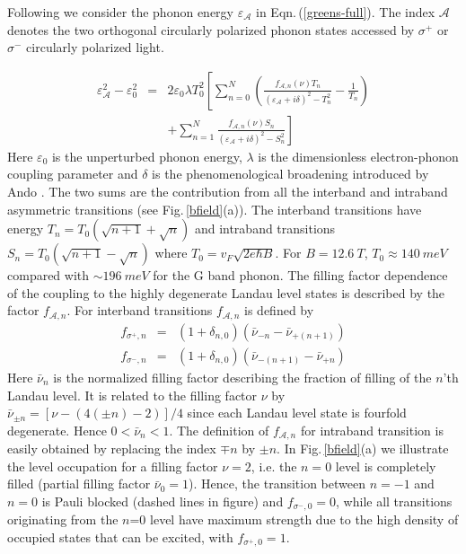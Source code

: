 \documentclass[prl,aps,superscriptaddress,showpacs,reprint]{revtex4-1}
\begin{document}
Following \cite{goerbig2007filling,ando2007magnetic,kossacki2012circular} we consider the phonon energy $\varepsilon_{\mathcal{A}}$ in Eqn.\,(\ref{greens-full}). The index $\mathcal{A}$ denotes the two orthogonal circularly polarized phonon states accessed by $\sigma^+$ or $\sigma^-$ circularly polarized light.

\begin{eqnarray}
\label{greens-full}
\varepsilon_{\mathcal{A}}^2-\varepsilon_0^2 &=& 2\varepsilon_0 \lambda T_0^2 \left[ \sum_{n=0}^N\left(\frac{f_{\mathcal{A},n}\left(\nu\right) T_n}{\left(\varepsilon_{\mathcal{A}}+i\delta\right)^2-T_n^2}-\frac{1}{T_n}\right)\right.\nonumber \\
& &\left. +\sum_{n=1}^{N}\frac{f_{\mathcal{A},n}\left(\nu\right) S_n}{\left(\varepsilon_{\mathcal{A}}+i\delta\right)^2-S_n^2}\right]
\end{eqnarray}
Here $\varepsilon_0$ is the unperturbed phonon energy, $\lambda$ is the dimensionless electron-phonon coupling parameter and $\delta$ is the phenomenological broadening introduced by Ando \cite{ando2007magnetic}. The two sums are the contribution from all the interband and intraband asymmetric transitions (see Fig.\,\ref{bfield}(a)). The interband transitions have energy $T_n=T_0\left(\sqrt{n+1}+\sqrt{n}\right)$ and intraband transitions $S_n=T_0\left(\sqrt{n+1}-\sqrt{n}\right)$ where $T_0=v_F\sqrt{2e\hbar B}$. For $B=12.6\: T$, $T_0 \approx 140\: meV$ compared with $\sim 196\: meV$ for the G band phonon.
The filling factor dependence of the coupling to the highly degenerate Landau level states is described by the factor $f_{\mathcal{A},n}$. For interband transitions $f_{\mathcal{A},n}$ is defined by
\begin{eqnarray}
\label{fterm}
f_{\sigma^+,n}&=&(1+\delta_{n,0})(\bar{\nu}_{-n}-\bar{\nu}_{+(n+1)})\nonumber\\
f_{\sigma^-,n}&=&(1+\delta_{n,0})(\bar{\nu}_{-(n+1)}-\bar{\nu}_{+n})
\end{eqnarray}
Here  $\bar{\nu}_{n} $ is the normalized  filling factor describing the fraction of filling of the $n$’th Landau level. It is related to the filling factor $\nu$ by $\bar{\nu}_{\pm n} = \left[\nu -(4(\pm n)-2)\right]/4$ since each Landau level state is fourfold degenerate.
Hence $0<\bar{\nu}_{n}<1$. The definition of $f_{\mathcal{A},n}$ for intraband transition is easily obtained by replacing the index $\mp n$ by $\pm n$. In  Fig.\,\ref{bfield}(a) we illustrate the level occupation for a filling factor $\nu=2$, i.e. the $n=0$ level is completely filled (partial filling factor $\bar{\nu}_0=1$). Hence,  the transition between $n=-1$ and $ n=0$ is Pauli blocked (dashed lines in figure) and  $f_{\sigma^-,0}=0$, while all transitions originating from the $n$=$0$ level have maximum strength due to the high density of occupied states that can be excited, with $f_{\sigma^+,0}=1$.
\end{document}

